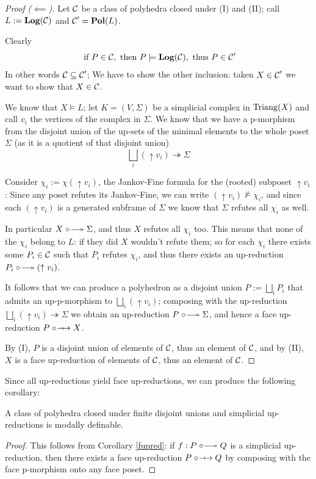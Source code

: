 \begin{proof}[Proof ($\impliedby$)]
    Let $\operatorname{\mathcal{C}}$ be a class of polyhedra closed under (I) and (II); call $L:=\operatorname{\textbf{Log}}(\operatorname{\mathcal{C}})$ and $\operatorname{\mathcal{C}}'=\operatorname{\textbf{Pol}}(L)$.

    Clearly \[\text{ if }P\in \operatorname{\mathcal{C}}, \text{ then }P\models\operatorname{\textbf{Log}}(\operatorname{\mathcal{C}}), \text{ thus }P\in \operatorname{\mathcal{C}}'\]
    In other words $\operatorname{\mathcal{C}}\subseteq \operatorname{\mathcal{C}}'$; We have to show the other inclusion: taken $X\in \operatorname{\mathcal{C}}'$ we want to show that $X\in \operatorname{\mathcal{C}}$.

    We know that $X\models L$; let $K=(V,\Sigma)$ be a simplicial complex in $\operatorname{Triang}(X)$ and call $v_i$ the vertices of the complex in $\Sigma$. We know that we have a p-morphism 
    from the disjoint union of the up-sets of the minimal elements to the whole poset $\Sigma$ (as it is a quotient of that disjoint union)
    \[\bigsqcup_i (\uparrow v_i)\twoheadrightarrow \Sigma\]

    Consider $\chi_i:=\chi(\uparrow v_i)$, the Jankov-Fine formula for the (rooted) subposet $\uparrow v_i$: Since any poset refutes its Jankov-Fine, we can write $(\uparrow v_i)\not\models \chi_i$, and since each $(\uparrow v_i)$ is a generated subframe of $\Sigma$
    we know that $\Sigma$ refutes all $\chi_i$ as well.

    In particular $X\upred\Sigma$, and thus $X$ refutes all $\chi_i$ too. This means that none of the $\chi_i$ belong to $L$: if they did $X$ wouldn't refute them; so for each $\chi_i$ there exists some $P_i\in \operatorname{\mathcal{C}}$ such that $P_i$ refutes $\chi_i$, and thus there exists an up-reduction $P_i\upred(\uparrow v_i)$.

    It follows that we can produce a polyhedron as a disjoint union $P:=\bigsqcup_i P_i$ that admits an up-p-morphism to $\bigsqcup_i(\uparrow v_i)$; composing with the up-reduction $\bigsqcup_i(\uparrow v_i)\twoheadrightarrow \Sigma$ we obtain an up-reduction $P\upred \Sigma$, and hence a face up-reduction $P\fupred X$.

    By (I), $P$ is a disjoint union of elements of $\operatorname{\mathcal{C}}$, thus an element of $\operatorname{\mathcal{C}}$, and by (II), $X$ is a face up-reduction of elements of $\operatorname{\mathcal{C}}$, thus an element of $\operatorname{\mathcal{C}}$.
\end{proof}

Since all up-reductions yield face up-reductions, we can produce the following corollary:
\begin{corollary}
    A class of polyhedra closed under finite disjoint unions and simplicial up-reductions is modally definable.
\end{corollary}
\begin{proof}
    This follows from Corollary \ref{fupred}: if $f:P\upred Q$ is a simplicial up-reduction, then there exists a face up-reduction $P\fupred Q$ by composing with the face p-morphism onto any face poset.
\end{proof}

